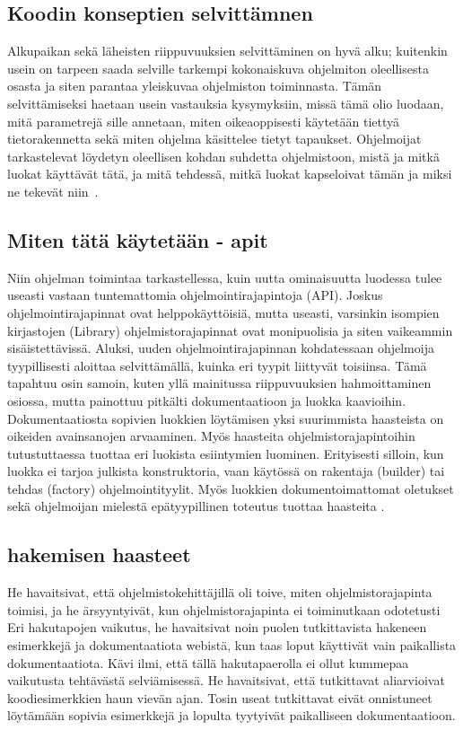 \documentclass[finnish]{../tktltiki2}
\theoremstyle{definition}
\theoremstyle{remark}
\begin{document}
\subsection{Koodin konseptien selvittämnen}
Alkupaikan sekä läheisten riippuvuuksien selvittäminen on hyvä alku; kuitenkin usein on tarpeen saada selville tarkempi kokonaiskuva ohjelmiton oleellisesta osasta ja siten parantaa yleiskuvaa ohjelmiston toiminnasta. Tämän selvittämiseksi haetaan usein vastauksia kysymyksiin, missä tämä olio luodaan, mitä parametrejä sille annetaan, miten oikeaoppisesti käytetään tiettyä tietorakennetta sekä miten ohjelma käsittelee tietyt tapaukset. Ohjelmoijat tarkastelevat löydetyn oleellisen kohdan suhdetta ohjelmistoon, mistä ja mitkä luokat käyttävät tätä, ja mitä tehdessä, mitkä luokat kapseloivat tämän ja miksi ne tekevät niin~\cite{questions-during-software-evolution-tasks}.

\subsection{Miten tätä käytetään - apit}
Niin ohjelman toimintaa tarkastellessa, kuin uutta ominaisuutta luodessa tulee useasti vastaan tuntemattomia ohjelmointirajapintoja (API). Joskus ohjelmointirajapinnat ovat helppokäyttöisiä, mutta useasti, varsinkin isompien kirjastojen (Library) ohjelmistorajapinnat ovat monipuolisia ja siten vaikeammin sisäistettävissä. Aluksi, uuden ohjelmointirajapinnan kohdatessaan ohjelmoija tyypillisesti aloittaa selvittämällä, kuinka eri tyypit liittyvät toisiinsa. Tämä tapahtuu osin samoin, kuten yllä mainitussa riippuvuuksien hahmoittaminen osiossa, mutta painottuu pitkälti dokumentaatioon ja luokka kaavioihin. Dokumentaatiosta sopivien luokkien löytämisen yksi suurimmista haasteista on oikeiden avainsanojen arvaaminen. Myös haasteita ohjelmistorajapintoihin tutustuttaessa tuottaa eri luokista esiintymien luominen. Erityisesti silloin, kun luokka ei tarjoa julkista konstruktoria, vaan käytössä on rakentaja (builder) tai tehdas (factory) ohjelmointityylit. Myös luokkien dokumentoimattomat oletukset sekä ohjelmoijan mielestä epätyypillinen toteutus tuottaa haasteita \cite{asking-and-answering-api-questions}.

\subsection{hakemisen haasteet}
He havaitsivat, että ohjelmistokehittäjillä oli toive, miten ohjelmistorajapinta toimisi, ja he ärsyyntyivät, kun ohjelmistorajapinta ei toiminutkaan odotetusti \cite{asking-and-answering-api-questions}
Eri hakutapojen vaikutus, he havaitsivat noin puolen tutkittavista hakeneen esimerkkejä ja dokumentaatiota webistä, kun taas loput käyttivät vain paikallista dokumentaatiota. Kävi ilmi, että tällä hakutapaerolla ei ollut kummepaa vaikutusta tehtävästä selviämisessä. He havaitsivat, että tutkittavat aliarvioivat koodiesimerkkien haun vievän ajan. Tosin useat tutkittavat eivät onnistuneet löytämään sopivia esimerkkejä ja lopulta tyytyivät paikalliseen dokumentaatioon.  \cite{asking-and-answering-api-questions}
\end{document}
